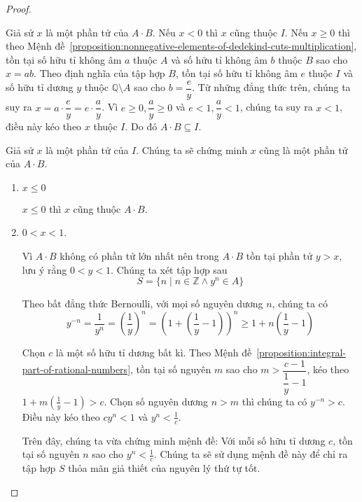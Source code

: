 \begin{proof}
\begin{enumerate}[label={\textbf{Trường hợp \arabic*.}},itemindent=2cm]
              \bigskip

              Giả sử $x$ là một phần tử của $A\cdot B$. Nếu $x < 0$ thì $x$ cũng thuộc $I$. Nếu $x\geq 0$ thì theo Mệnh đề~\ref{proposition:nonnegative-elements-of-dedekind-cuts-multiplication}, tồn tại số hữu tỉ không âm $a$ thuộc $A$ và số hữu tỉ không âm $b$ thuộc $B$ sao cho $x = ab$. Theo định nghĩa của tập hợp $B$, tồn tại số hữu tỉ không âm $e$ thuộc $I$ và số hữu tỉ dương $y$ thuộc $\mathbb{Q}\setminus A$ sao cho $b = \dfrac{e}{y}$. Từ những đẳng thức trên, chúng ta suy ra $x = a\cdot\dfrac{e}{y} = e\cdot\dfrac{a}{y}$. Vì $e\geq 0, \dfrac{a}{y}\geq 0$ và $e < 1, \dfrac{a}{y} < 1$, chúng ta suy ra $x < 1$, điều này kéo theo $x$ thuộc $I$. Do đó $A\cdot B \subseteq I$.
              \bigskip

              Giả sử $x$ là một phần tử của $I$. Chúng ta sẽ chứng minh $x$ cũng là một phần tử của $A\cdot B$.
              \begin{enumerate}[label={\textbf{Khả năng \arabic*.}},itemindent=1.5cm]
                  \item $x\leq 0$

                        $x\leq 0$ thì $x$ cũng thuộc $A\cdot B$.
                  \item $0 < x < 1$.

                        Vì $A\cdot B$ không có phần tử lớn nhất nên trong $A\cdot B$ tồn tại phần tử $y > x$, lưu ý rằng $0 < y < 1$. Chúng ta xét tập hợp sau
                        \[
                            S = \{ n \mid n\in\mathbb{Z} \wedge y^{n}\in A \}
                        \]

                        Theo bất đẳng thức Bernoulli, với mọi số nguyên dương $n$, chúng ta có
                        \[
                            y^{-n} = \dfrac{1}{y^{n}} = {\left(\frac{1}{y}\right)}^{n} = {\left(1 + \left(\frac{1}{y} - 1\right)\right)}^{n}\geq 1 + n\left(\frac{1}{y} - 1\right)
                        \]

                        Chọn $c$ là một số hữu tỉ dương bất kì. Theo Mệnh đề~\ref{proposition:integral-part-of-rational-numbers}, tồn tại số nguyên $m$ sao cho $m > \dfrac{c - 1}{\dfrac{1}{y} - 1}$, kéo theo $1 + m\left(\frac{1}{y} - 1\right) > c$. Chọn số nguyên dương $n > m$ thì chúng ta có $y^{-n} > c$. Điều này kéo theo $cy^{n} < 1$ và $y^{n} < \frac{1}{c}$.

                        Trên đây, chúng ta vừa chứng minh mệnh đề: Với mỗi số hữu tỉ dương $c$, tồn tại số nguyên $n$ sao cho $y^{n} < \frac{1}{c}$. Chúng ta sẽ sử dụng mệnh đề này để chỉ ra tập hợp $S$ thỏa mãn giả thiết của nguyên lý thứ tự tốt.


\end{enumerate}
\end{enumerate}
\end{proof}

